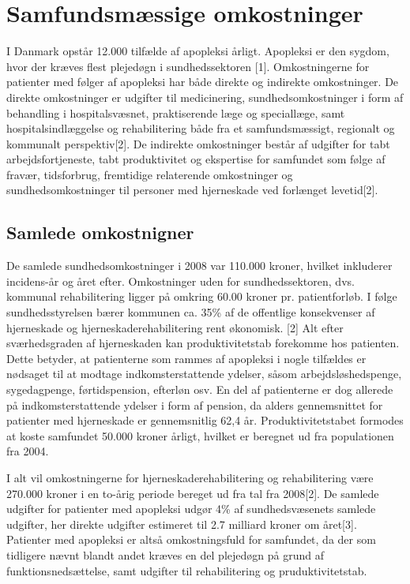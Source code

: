 \section{Samfundsmæssige omkostninger}
I Danmark opstår 12.000 tilfælde af apopleksi årligt. Apopleksi er den sygdom, hvor der kræves flest plejedøgn i sundhedssektoren [1]. %
Omkostningerne for patienter med følger af apopleksi har både direkte og indirekte omkostninger. De direkte omkostninger er udgifter til medicinering, sundhedsomkostninger i form af behandling i hospitalsvæsnet, praktiserende læge og speciallæge, samt hospitalsindlæggelse og rehabilitering både fra et samfundsmæssigt, regionalt og kommunalt perspektiv[2]. De indirekte omkostninger  består af udgifter for tabt arbejdsfortjeneste, tabt produktivitet og ekspertise for samfundet som følge af fravær, tidsforbrug, fremtidige relaterende omkostninger og sundhedsomkostninger til personer med hjerneskade ved forlænget levetid[2].

\subsection{Samlede omkostnigner}
De samlede sundhedsomkostninger i 2008 var 110.000 kroner, hvilket inkluderer incidens-år og året efter. Omkostninger uden for sundhedssektoren, dvs. kommunal rehabilitering ligger på omkring 60.00 kroner pr. patientforløb. I følge sundhedsstyrelsen bærer kommunen ca. 35\% af de offentlige konsekvenser af hjerneskade og hjerneskaderehabilitering rent økonomisk. [2]    
Alt efter sværhedsgraden af hjerneskaden kan produktivitetstab forekomme hos patienten. Dette betyder, at patienterne som rammes af apopleksi i nogle tilfældes er nødsaget til at modtage indkomsterstattende ydelser, såsom arbejdsløshedspenge, sygedagpenge, førtidspension, efterløn osv. En del af patienterne er dog allerede på indkomsterstattende ydelser i form af pension, da alders gennemsnittet for patienter med hjerneskade er gennemsnitlig 62,4 år. Produktivitetstabet formodes at koste samfundet 50.000 kroner årligt, hvilket er beregnet ud fra populationen fra 2004. 

I alt vil omkostningerne for hjerneskaderehabilitering og rehabilitering være 270.000 kroner i en to-årig periode bereget ud fra tal fra 2008[2]. De samlede udgifter for patienter med apopleksi udgør 4\% af sundhedsvæsenets samlede udgifter, her direkte udgifter estimeret til 2.7 milliard kroner om året[3]. 
Patienter med apopleksi er altså omkostningsfuld for samfundet, da der som tidligere nævnt blandt andet kræves en del plejedøgn på grund af funktionsnedsættelse, samt udgifter til rehabilitering og pruduktivitetstab.


